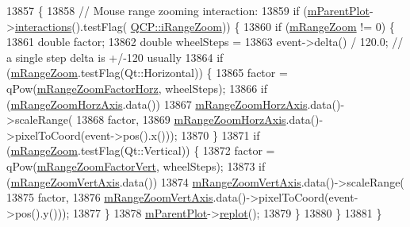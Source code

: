 \begin{DoxyCode}
13857                                                \{
13858   \textcolor{comment}{// Mouse range zooming interaction:}
13859   \textcolor{keywordflow}{if} (\hyperlink{class_q_c_p_layerable_aa2a528433e44db02b8aef23c1f9f90ed}{mParentPlot}->\hyperlink{class_q_custom_plot_a12401c02b6949a717f5749bb28c62983}{interactions}().testFlag(
      \hyperlink{namespace_q_c_p_a2ad6bb6281c7c2d593d4277b44c2b037abee1e94353525a636aeaf0ba32b72e14}{QCP::iRangeZoom})) \{
13860     \textcolor{keywordflow}{if} (\hyperlink{class_q_c_p_axis_rect_a215eff671d48df2edccc36e7f976f28c}{mRangeZoom} != 0) \{
13861       \textcolor{keywordtype}{double} factor;
13862       \textcolor{keywordtype}{double} wheelSteps =
13863           \textcolor{keyword}{event}->delta() / 120.0; \textcolor{comment}{// a single step delta is +/-120 usually}
13864       \textcolor{keywordflow}{if} (\hyperlink{class_q_c_p_axis_rect_a215eff671d48df2edccc36e7f976f28c}{mRangeZoom}.testFlag(Qt::Horizontal)) \{
13865         factor = qPow(\hyperlink{class_q_c_p_axis_rect_ad08d0250ed7b99de387d0ea6c7fd4dc1}{mRangeZoomFactorHorz}, wheelSteps);
13866         \textcolor{keywordflow}{if} (\hyperlink{class_q_c_p_axis_rect_ae22f882bab20518559f3fbb84243d0ab}{mRangeZoomHorzAxis}.data())
13867           \hyperlink{class_q_c_p_axis_rect_ae22f882bab20518559f3fbb84243d0ab}{mRangeZoomHorzAxis}.data()->scaleRange(
13868               factor,
13869               \hyperlink{class_q_c_p_axis_rect_ae22f882bab20518559f3fbb84243d0ab}{mRangeZoomHorzAxis}.data()->pixelToCoord(event->pos().x()));
13870       \}
13871       \textcolor{keywordflow}{if} (\hyperlink{class_q_c_p_axis_rect_a215eff671d48df2edccc36e7f976f28c}{mRangeZoom}.testFlag(Qt::Vertical)) \{
13872         factor = qPow(\hyperlink{class_q_c_p_axis_rect_a32f063629581d5bf82b12769940b34ad}{mRangeZoomFactorVert}, wheelSteps);
13873         \textcolor{keywordflow}{if} (\hyperlink{class_q_c_p_axis_rect_a8b9acd16a203a9692bd35a9465f54bc1}{mRangeZoomVertAxis}.data())
13874           \hyperlink{class_q_c_p_axis_rect_a8b9acd16a203a9692bd35a9465f54bc1}{mRangeZoomVertAxis}.data()->scaleRange(
13875               factor,
13876               \hyperlink{class_q_c_p_axis_rect_a8b9acd16a203a9692bd35a9465f54bc1}{mRangeZoomVertAxis}.data()->pixelToCoord(event->pos().y()));
13877       \}
13878       \hyperlink{class_q_c_p_layerable_aa2a528433e44db02b8aef23c1f9f90ed}{mParentPlot}->\hyperlink{class_q_custom_plot_a606fd384b2a637ce2c24899bcbde77d6}{replot}();
13879     \}
13880   \}
13881 \}
\end{DoxyCode}


